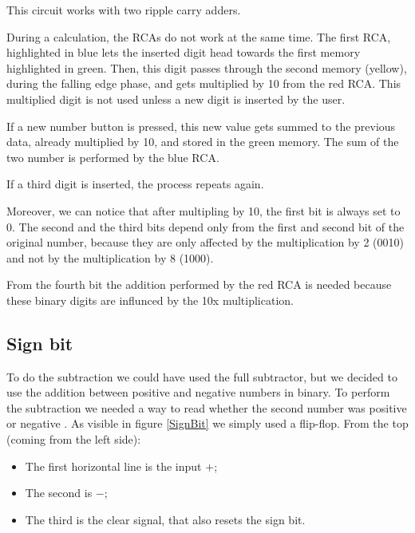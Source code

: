 \documentclass{article}
\begin{document}
This circuit works with two ripple carry adders.

\vspace{3mm}

During a calculation, the RCAs do not work at the same time. The first RCA, highlighted in blue lets the inserted digit head towards the first memory highlighted in green. Then, this digit passes through the second memory (yellow), during the falling edge phase, and gets multiplied by 10 from the red RCA. This multiplied digit is not used unless a new digit is inserted by the user.

\vspace{3mm}

If a new number button is pressed, this new value gets summed to the previous data, already multiplied by 10, and stored in the green memory. The sum of the two number is performed by the blue RCA.

\vspace{3mm}

If a third digit is inserted, the process repeats again.

\vspace{3mm}

Moreover, we can notice that after multipling by 10, the first bit is always set to 0. The second and the third bits depend only from the first and second bit of the original number, because they are only affected by the multiplication by 2 (0010) and not by the multiplication by 8 (1000). 

From the fourth bit the addition performed by the red RCA is needed because these binary digits are influnced by the 10x multiplication. %






\subsection{Sign bit}

To do the subtraction we could have used the full subtractor, but we decided to use the addition between positive and negative numbers in binary. To perform the subtraction we needed a way to read whether the second number was positive or negative . As visible in figure \ref{SignBit} we simply used a flip-flop. From the top (coming from the left side):
\begin{itemize}
    \item The first horizontal line is the input $+$;
    \item The second is $-$;
    \item The third is the clear signal, that also resets the sign bit.
\end{itemize}
\end{document}
